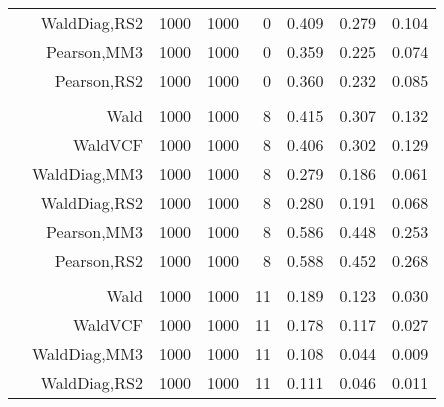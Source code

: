 \documentclass[
]{article}
\begin{document}
\begin{table}[H]
{\begin{tabular}[t]{lrrrrrrr}
\hspace{1em} & WaldDiag,RS2 & 1000 & 1000 & 0 & 0.409 & 0.279 & 0.104\\

\hspace{1em} & Pearson,MM3 & 1000 & 1000 & 0 & 0.359 & 0.225 & 0.074\\

\hspace{1em} & Pearson,RS2 & 1000 & 1000 & 0 & 0.360 & 0.232 & 0.085\\
\cmidrule{1-8}
\addlinespace[0.3em]
\multicolumn{8}{l}{\textbf{1F 15V}}\\
\hspace{1em} & Wald & 1000 & 1000 & 8 & 0.415 & 0.307 & 0.132\\

\hspace{1em} & WaldVCF & 1000 & 1000 & 8 & 0.406 & 0.302 & 0.129\\

\hspace{1em} & WaldDiag,MM3 & 1000 & 1000 & 8 & 0.279 & 0.186 & 0.061\\

\hspace{1em} & WaldDiag,RS2 & 1000 & 1000 & 8 & 0.280 & 0.191 & 0.068\\

\hspace{1em} & Pearson,MM3 & 1000 & 1000 & 8 & 0.586 & 0.448 & 0.253\\

\hspace{1em} & Pearson,RS2 & 1000 & 1000 & 8 & 0.588 & 0.452 & 0.268\\
\cmidrule{1-8}
\addlinespace[0.3em]
\multicolumn{8}{l}{\textbf{2F 10V}}\\
\hspace{1em} & Wald & 1000 & 1000 & 11 & 0.189 & 0.123 & 0.030\\

\hspace{1em} & WaldVCF & 1000 & 1000 & 11 & 0.178 & 0.117 & 0.027\\

\hspace{1em} & WaldDiag,MM3 & 1000 & 1000 & 11 & 0.108 & 0.044 & 0.009\\

\hspace{1em} & WaldDiag,RS2 & 1000 & 1000 & 11 & 0.111 & 0.046 & 0.011\\


\end{tabular}}
\end{table}
\end{document}
